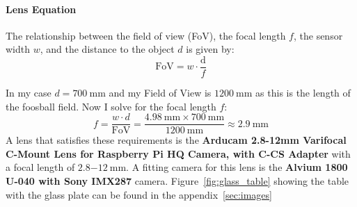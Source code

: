 \paragraph{Lens Equation}\label{par:lens_equation}

The relationship between the field of view (FoV), the focal length $f$, the sensor width $w$, and the distance to the object $d$ is given by:
\begin{equation}
    \text{FoV} = w \cdot \frac{\text{d}}{f}\label{eq:lens_equation}
\end{equation}


\noindent In my case $d = \qty[per-mode=symbol]{700}{\mm}$ and my Field of View is $\qty[per-mode=symbol]{1200}{\mm}$ as this is the length of the foosball field.
Now I solve for the focal length $f$:
\begin{equation}
    \label{eq:focal_length}
    f = \frac{w \cdot d}{\text{FoV}} = \frac{\qty[per-mode=symbol]{4.98}{\mm} \times \qty[per-mode=symbol]{700}{\mm}}{\qty[per-mode=symbol]{1200}{\mm}} \approx \qty[per-mode=symbol]{2.9}{\mm}
\end{equation}
A lens that satisfies these requirements is the \textbf{Arducam 2.8-12mm Varifocal C-Mount Lens for Raspberry Pi HQ Camera, with C-CS Adapter\autocite{arducam-lens}} with a focal length of $\qty[per-mode=symbol]{2.8-12}{\mm}$.
A fitting camera for this lens is the \textbf{Alvium 1800 U-040 with Sony IMX287}\autocite{allied-vision-lens} camera.
Figure~\ref{fig:glass_table} showing the table with the glass plate can be found in the appendix~\ref{sec:images}